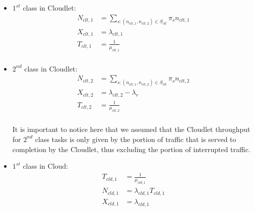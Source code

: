 \begin{itemize}
	
	\item $1^{st}$ class in Cloudlet:
	\begin{equation} 
		\begin{split}
			N_{clt,1} &= \sum_{s: (n_{clt,1},n_{clt,2}) \in S_{clt}} \pi_{s} n_{clt,1}  \\
			X_{clt,1} &= \lambda_{clt,1} \\
			T_{clt,1} &= \frac{1}{\mu_{clt,1}} \\
		\end{split}
	\end{equation}

	\item $2^{nd}$ class in Cloudlet:
	\begin{equation} 
		\begin{split}
			N_{clt,2} &= \sum_{s: (n_{clt,1},n_{clt,2}) \in S_{clt}} \pi_{s} n_{clt,2}  \\
			X_{clt,2} &= \lambda_{clt,2} - \lambda_{r} \\
			T_{clt,2} &= \frac{1}{\mu_{clt,2}} \\
		\end{split}
	\end{equation}

It is important to notice here that we assumed that the Cloudlet throughput for $2^{nd}$ class tasks is only given by the portion of traffic that is served to completion by the Cloudlet, thus excluding the portion of interrupted traffic.

	\item $1^{st}$ class in Cloud:
	\begin{equation} 
		\begin{split}
			T_{cld,1} &= \frac{1}{\mu_{cld,1}} \\
			N_{cld,1} &= \lambda_{cld,1}T_{cld,1} \\
			X_{cld,1} &= \lambda_{cld,1} \\
		\end{split}
	\end{equation}
	

\end{itemize}
